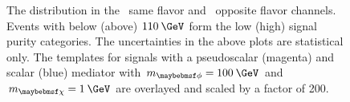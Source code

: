 \begin{figure}[h!]
  \caption{The \mttll distribution in the~\protect{} same flavor and~\protect{} opposite flavor channels. Events with \mttll below (above) $110\:\GeV$ form the low (high) signal purity categories. The uncertainties in the above plots are statistical only. The \mttll templates for signals with a pseudoscalar (magenta) and scalar (blue) mediator with $\mMed=100\:\GeV$ and $\mDM=1\:\GeV$ are overlayed and scaled by a factor of 200.}
  \label{fig:mt2_sr}
\end{figure}

